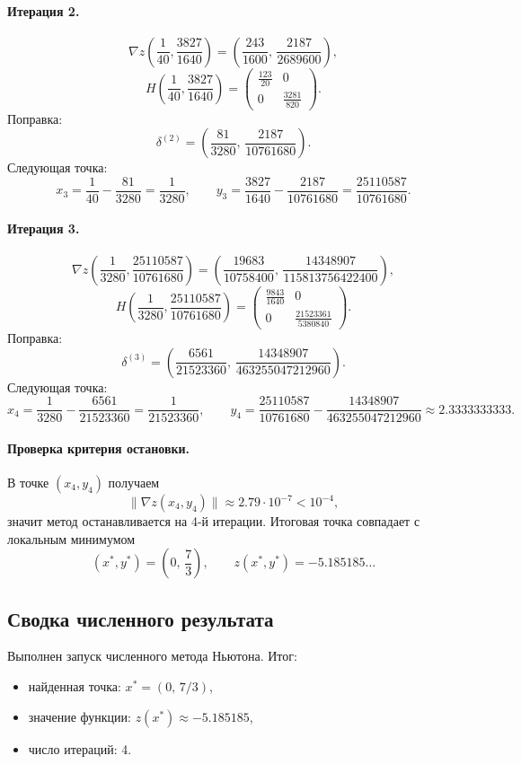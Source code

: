 \documentclass[12pt,a4paper]{article}
\begin{document}
\paragraph{Итерация 2.}
\[
\nabla z\left(\frac1{40},\frac{3827}{1640}\right)=
\left(\frac{243}{1600},\,\frac{2187}{2689600}\right),
\]
\[
H\left(\frac1{40},\frac{3827}{1640}\right)=
\begin{pmatrix}
\frac{123}{20} & 0\\
0 & \frac{3281}{820}
\end{pmatrix}.
\]
Поправка:
\[
\delta^{(2)}=
\left(\frac{81}{3280},\,\frac{2187}{10761680}\right).
\]
Следующая точка:
\[
x_3=\frac1{40}-\frac{81}{3280}=\frac1{3280},
\qquad
y_3=\frac{3827}{1640}-\frac{2187}{10761680}=\frac{25110587}{10761680}.
\]

\paragraph{Итерация 3.}
\[
\nabla z\left(\frac1{3280},\frac{25110587}{10761680}\right)=
\left(\frac{19683}{10758400},\,\frac{14348907}{115813756422400}\right),
\]
\[
H\left(\frac1{3280},\frac{25110587}{10761680}\right)=
\begin{pmatrix}
\frac{9843}{1640} & 0\\
0 & \frac{21523361}{5380840}
\end{pmatrix}.
\]
Поправка:
\[
\delta^{(3)}=
\left(\frac{6561}{21523360},\,\frac{14348907}{463255047212960}\right).
\]
Следующая точка:
\[
x_4=\frac1{3280}-\frac{6561}{21523360}=\frac1{21523360},
\qquad
y_4=\frac{25110587}{10761680}-\frac{14348907}{463255047212960}
\approx 2.3333333333.
\]

\paragraph{Проверка критерия остановки.}
В точке $(x_4,y_4)$ получаем
\[
\|\nabla z(x_4,y_4)\|\approx 2.79\cdot 10^{-7}<10^{-4},
\]
значит метод останавливается на 4-й итерации. Итоговая точка совпадает с локальным минимумом
\[
(x^*,y^*)=\left(0,\,\frac73\right),
\qquad
z(x^*,y^*)=-5.185185\ldots
\]

\subsection{Сводка численного результата}
Выполнен запуск численного метода Ньютона. Итог:
\begin{itemize}
  \item найденная точка: $x^*=(0,\,7/3)$,
  \item значение функции: $z(x^*)\approx -5.185185$,
  \item число итераций: 4.
\end{itemize}
\end{document}

